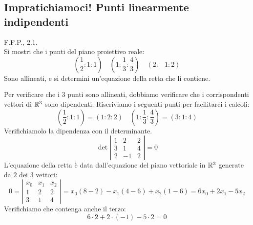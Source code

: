 \subsection{Impratichiamoci! Punti linearmente indipendenti}
\begin{exercise}\textsc{F.F.P., 2.1.}\\
	Si mostri che i punti del piano proiettivo reale:
	\begin{equation}
		\left(\frac{1}{2}\colon 1 \colon 1\right)\quad \left(1\colon \frac{1}{3} \colon \frac{4}{3}\right)\quad \left(2\colon -1 \colon 2\right)
	\end{equation}
Sono allineati, e si determini un'equazione della retta che li contiene.
\end{exercise}
\begin{solution}
	Per verificare che i $3$ punti sono allineati, dobbiamo verificare che i corrispondenti vettori di $\mathbb{R}^3$ sono dipendenti. Riscriviamo i seguenti punti per facilitarci i calcoli:
\begin{equation*}
	\left(\frac{1}{2}\colon 1 \colon 1\right)=\left(1\colon 2 \colon 2\right)\quad \left(1\colon \frac{1}{3} \colon \frac{4}{3}\right)=\left(3\colon 1 \colon 4\right)
\end{equation*}
Verifichiamolo la dipendenza con il determinante.
	\begin{equation*}
		\det\left|\begin{array}{ccc}
			1 & 2 & 2\\
			3 & 1 & 4\\
			2 & -1 & 2
		\end{array}\right|=0
	\end{equation*}
L'equazione della retta è data dall'equazione del piano vettoriale in $\mathbb{R}^3$ generate da $2$ dei $3$ vettori:
\begin{equation*}
	0=\left|\begin{array}{ccc}
		x_0 & x_1 & x_2\\
		1 & 2 & 2\\
		3 & 1 & 4
	\end{array}\right|=x_0\left(8-2\right)-x_1\left(4-6\right)+x_2\left(1-6\right)=6x_0+2x_1-5x_2
\end{equation*}
Verifichiamo che contenga anche il terzo:
\begin{equation*}
	6\cdot 2 + 2\cdot \left(-1\right) -5\cdot 2=0
\end{equation*}
\end{solution}
